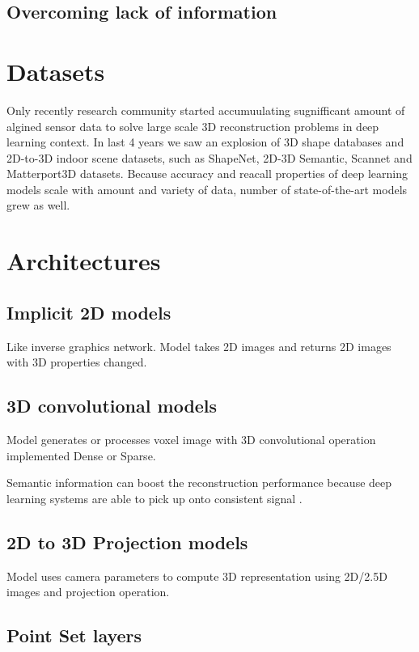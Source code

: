 \subsection{Overcoming lack of information}

\section{Datasets}

Only recently research community started accumuulating sugnifficant amount of algined sensor data to solve large scale 3D reconstruction problems in deep learning context. In last 4 years we saw an explosion of 3D shape databases and 2D-to-3D indoor scene datasets, such as ShapeNet, 2D-3D Semantic, Scannet and Matterport3D datasets. Because accuracy and reacall properties of deep learning models scale with amount and variety of data, number of state-of-the-art models grew as well.

\section{Architectures}

\subsection{Implicit 2D models}

Like inverse graphics network. Model takes 2D images and returns 2D images with 3D properties changed. 

\subsection{3D convolutional models}

Model generates or processes voxel image with 3D convolutional operation implemented Dense or Sparse.

Semantic information can boost the reconstruction performance because deep learning systems are able to pick up onto consistent signal \cite{jiao2018look,tatarchenko2019single,kendall2018multi}.

\subsection{2D to 3D Projection models}

Model uses camera parameters to compute 3D representation using 2D/2.5D images and projection operation.

\subsection{Point Set layers}

